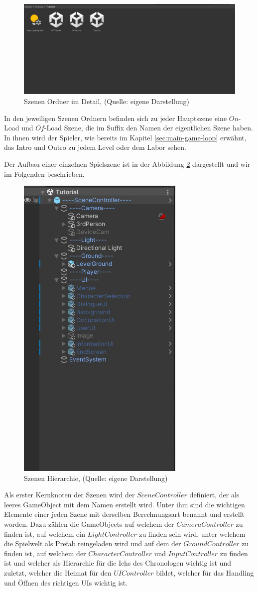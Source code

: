 \begin{figure}[ht]
\centering
\includegraphics[width=1\linewidth]{content/pictures/Detail.jpg}
\caption{Szenen Ordner im Detail, (Quelle: eigene Darstellung)}
\label{fig:scenes_detail}
\end{figure}

In den jeweiligen Szenen Ordnern befinden sich zu jeder Hauptszene eine $On$-Load und $Of$-Load Szene, die im Suffix den Namen der eigentlichen Szene  haben. In ihnen wird der Spieler, wie bereits im Kapitel \ref{sec:main-game-loop} erwähnt, das Intro und Outro zu jedem Level oder dem Labor sehen.

Der Aufbau einer einzelnen Spielszene ist in der Abbildung \ref{fig:scenes_hierachy}  dargestellt und wir im Folgenden beschrieben.
\begin{figure}[ht]
\centering
\includegraphics[width=0.3\linewidth]{content/pictures/Hierachie.jpg}
\caption{Szenen Hierarchie, (Quelle: eigene Darstellung)}
\label{fig:scenes_hierachy}
\end{figure}

Als erster Kernknoten der Szenen wird der $SceneController$ definiert, der als leeres GameObject mit dem Namen  erstellt wird. Unter ihm sind die wichtigen Elemente einer jeden Szene mit derselben Berechnungsart benannt und erstellt worden. Dazu zählen die GameObjects  auf welchem der $CameraController$ zu finden ist,  auf welchem ein $LightController$ zu finden sein wird,  unter welchem die Spielwelt als Prefab reingeladen wird und auf dem der $GroundController$ zu finden ist,  auf welchem der $CharacterController$ und $InputController$ zu finden ist und welcher als Hierarchie für die Ichs des Chronologen wichtig ist und zuletzt,  welcher die Heimat für den $UIController$ bildet, welcher für das Handling und Öffnen des richtigen \ac{UI}s wichtig ist. 

